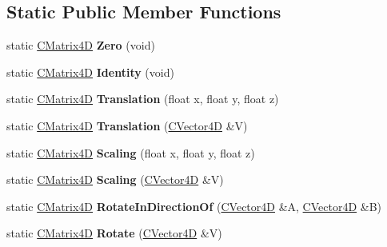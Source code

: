 \subsection*{Static Public Member Functions}
\begin{DoxyCompactItemize}
\item 
static \hyperlink{class_c_matrix4_d}{C\+Matrix4D} {\bfseries Zero} (void)\hypertarget{class_c_matrix4_d_a672a621085c1d5a39d48d4a4b05dfd20}{}\label{class_c_matrix4_d_a672a621085c1d5a39d48d4a4b05dfd20}

\item 
static \hyperlink{class_c_matrix4_d}{C\+Matrix4D} {\bfseries Identity} (void)\hypertarget{class_c_matrix4_d_a8d2d9c0df5c3561c66c84e502902cd09}{}\label{class_c_matrix4_d_a8d2d9c0df5c3561c66c84e502902cd09}

\item 
static \hyperlink{class_c_matrix4_d}{C\+Matrix4D} {\bfseries Translation} (float x, float y, float z)\hypertarget{class_c_matrix4_d_a700a8a50ad365aeda624fe628a42b3ca}{}\label{class_c_matrix4_d_a700a8a50ad365aeda624fe628a42b3ca}

\item 
static \hyperlink{class_c_matrix4_d}{C\+Matrix4D} {\bfseries Translation} (\hyperlink{struct_c_vector4_d}{C\+Vector4D} \&V)\hypertarget{class_c_matrix4_d_aba9b50953d2adae5aa7549be34116c49}{}\label{class_c_matrix4_d_aba9b50953d2adae5aa7549be34116c49}

\item 
static \hyperlink{class_c_matrix4_d}{C\+Matrix4D} {\bfseries Scaling} (float x, float y, float z)\hypertarget{class_c_matrix4_d_a52aa3f319ed1ad264785681f8847e720}{}\label{class_c_matrix4_d_a52aa3f319ed1ad264785681f8847e720}

\item 
static \hyperlink{class_c_matrix4_d}{C\+Matrix4D} {\bfseries Scaling} (\hyperlink{struct_c_vector4_d}{C\+Vector4D} \&V)\hypertarget{class_c_matrix4_d_afa360e033f22d5d8fdfbaedfa90ac7b4}{}\label{class_c_matrix4_d_afa360e033f22d5d8fdfbaedfa90ac7b4}

\item 
static \hyperlink{class_c_matrix4_d}{C\+Matrix4D} {\bfseries Rotate\+In\+Direction\+Of} (\hyperlink{struct_c_vector4_d}{C\+Vector4D} \&A, \hyperlink{struct_c_vector4_d}{C\+Vector4D} \&B)\hypertarget{class_c_matrix4_d_a313014d1d441cbc4f441485d360f5738}{}\label{class_c_matrix4_d_a313014d1d441cbc4f441485d360f5738}

\item 
static \hyperlink{class_c_matrix4_d}{C\+Matrix4D} {\bfseries Rotate} (\hyperlink{struct_c_vector4_d}{C\+Vector4D} \&V)\hypertarget{class_c_matrix4_d_a7e24c39aaabee26b326efe9d3e5130d4}{}\label{class_c_matrix4_d_a7e24c39aaabee26b326efe9d3e5130d4}


\end{DoxyCompactItemize}
